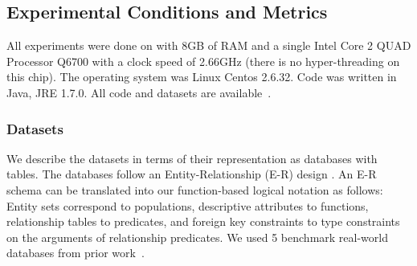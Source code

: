 \documentclass[twoside,11pt]{article}
\begin{document}
\subsection{Experimental Conditions and Metrics}\label{sec:conditions}

All experiments were done on with 8GB of RAM and a single Intel Core 2 QUAD Processor Q6700 with a clock speed of 2.66GHz (there is no hyper-threading on this chip). The operating system was Linux Centos 2.6.32. Code was written in Java, JRE 1.7.0. All code and datasets are available~\cite{bib:jbnsite}. 

\subsubsection{Datasets}

We describe the datasets in terms of their representation as databases with tables. The databases follow an Entity-Relationship (E-R) design \cite{Ullman1982}. An E-R schema can be translated into our function-based logical notation as follows: Entity sets correspond to populations, descriptive attributes to functions, relationship tables to predicates, and foreign key constraints to type constraints on the arguments of relationship predicates.
%
We used %
5 benchmark real-world databases from prior work~\cite{Schulte2012}. 


\end{document}
